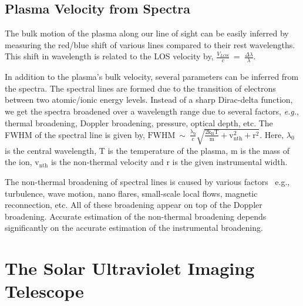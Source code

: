 {%
\subsection{Plasma Velocity from Spectra}

The bulk motion of the plasma along our line of sight can be easily inferred by measuring the red/blue shift of various lines compared to their rest wavelengths. This shift in wavelength is related to the LOS velocity by, $\frac{V_{LOS}}{c}~=~\frac{\Delta \lambda}{\lambda}$.

In addition to the plasma's bulk velocity, several parameters can be inferred from the spectra. The spectral lines are formed due to the transition of electrons between two atomic/ionic energy levels. Instead of a sharp Dirac-delta function, we get the spectra broadened over a wavelength range due to several factors, {\it e.g.}, thermal broadening, Doppler broadening, pressure, optical depth, etc. The FWHM of the spectral line is given by, $\mathrm{FWHM~\sim~\frac{\lambda_{0}}{c}\sqrt{\frac{2k_{B}T}{m}+v_{nth}^{2}+r^{2}}}$. Here, $\lambda_{0}$ is the central wavelength, T is the temperature of the plasma, m is the mass of the ion, $\mathrm{v_{nth}}$ is the non-thermal velocity and r is the given instrumental width. 

The non-thermal broadening of spectral lines is caused by various factors {\, e.g.}, turbulence, wave motion, nano flares, small-scale local flows, magnetic reconnection, etc. All of these broadening appear on top of the Doppler broadening. Accurate estimation of the non-thermal broadening depends significantly on the accurate estimation of the instrumental broadening.

\section{The Solar Ultraviolet Imaging Telescope}

}
